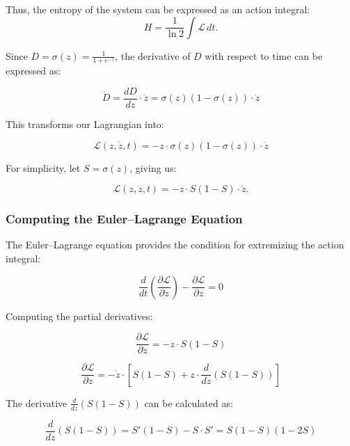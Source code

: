 \documentclass{article}
\begin{document}
Thus, the entropy of the system can be expressed as an action integral:
\begin{equation}
	H = \frac{1}{\ln 2} \int \mathcal{L} \, dt.
\end{equation}

Since $D = \sigma(z) = \frac{1}{1 + e^{-z}}$, the derivative of $D$ with respect to time can be expressed as:

\begin{equation}
	\dot{D} = \frac{dD}{dz} \cdot \dot{z} = \sigma(z)(1 - \sigma(z)) \cdot \dot{z}
\end{equation}

This transforms our Lagrangian into:

\begin{equation}
	\mathcal{L}(z, \dot{z}, t) = -z \cdot \sigma(z)(1 - \sigma(z)) \cdot \dot{z}
\end{equation}

For simplicity, let $S = \sigma(z)$, giving us:

\begin{equation}
	\mathcal{L}(z, \dot{z}, t) = -z \cdot S(1 - S) \cdot \dot{z}.
\end{equation}

\subsubsection{Computing the Euler–Lagrange Equation}

The Euler–Lagrange equation provides the condition for extremizing the action integral:

\begin{equation}
	\frac{d}{dt}\left(\frac{\partial \mathcal{L}}{\partial \dot{z}}\right) - \frac{\partial \mathcal{L}}{\partial z} = 0
\end{equation}

Computing the partial derivatives:

\begin{equation}
	\frac{\partial \mathcal{L}}{\partial \dot{z}} = -z \cdot S(1 - S)
\end{equation}

\begin{equation}
	\frac{\partial \mathcal{L}}{\partial z} = -\dot{z} \cdot \left[S(1 - S) + z \cdot \frac{d}{dz}(S(1 - S))\right]
\end{equation}

The derivative $\frac{d}{dz}(S(1 - S))$ can be calculated as:

\begin{equation}
	\frac{d}{dz}(S(1 - S)) = S'(1 - S) - S \cdot S' = S(1 - S)(1 - 2S)
\end{equation}
\end{document}
